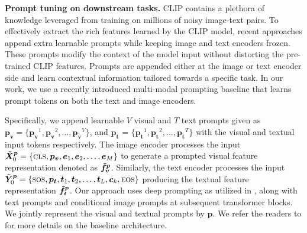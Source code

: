 \documentclass[a4paper]{article}
\begin{document}
\noindent
\textbf{Prompt tuning on downstream tasks. }
CLIP contains a plethora of knowledge leveraged from training on millions of noisy image-text pairs. 
To effectively extract the rich features learned by the CLIP model, 
recent approaches \cite{zhou2022coop, zhou2022cocoop, khattakMaPLe, bahng2022visual, zang2022unified} append extra learnable prompts while keeping image and text encoders frozen. These prompts modify the context of the model input without distorting the pre-trained CLIP features. Prompts are appended either at the image or text encoder side and learn contextual information tailored towards a specific task.
In our work, we use a recently introduced multi-modal prompting baseline \cite{khattakMaPLe} that learns prompt tokens on both the text and image encoders. \par

Specifically, we append learnable $V$ visual and $T$ text prompts given as $\bm{p_{v}} = \{ \bm{p_{v}}^1, \bm{p_{v}}^2, \hdots, \bm{p_{v}}^{V} \}$, and $\bm{p_{t}}$ = $\{ \bm{p_{t}}^1, \bm{p_{t}}^2, \hdots, \bm{p_{t}}^{T} \}$ with the visual and textual input tokens respectively. The image encoder processes the input $\bm{\Tilde{X}^p}_{0} = \{ {\textsc{cls}}, \bm{p_{v}}, \bm{e}_{1}, \bm{e}_{2}, \hdots, \bm{e}_{M} \} $ to generate a prompted visual feature representation denoted as $\bm{\Tilde{f}^p_v}$. Similarly, the text encoder processes the input $ \bm{\Tilde{Y}^p}_{0} = \{ {\textsc{sos}}, \bm{p_{t}}, \bm{t}_{1}, \bm{t}_{2}, \hdots, \bm{t}_{L}, \bm{c}_{k}, {\textsc{eos}} \}$ producing the textual feature representation $\bm{\Tilde{f}^p_t}$. Our approach uses deep prompting as utilized in \cite{khattakMaPLe}, along with text prompts and conditional image prompts at subsequent transformer blocks. We jointly represent the visual and textual prompts by $\bm{p}$. We refer the readers to \cite{khattakMaPLe} for more details on the baseline architecture.
\end{document}
